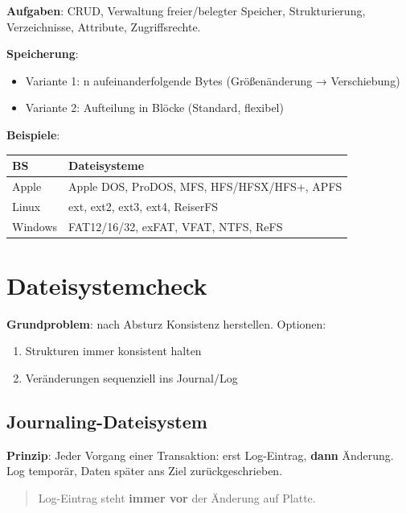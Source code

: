 \documentclass[11pt, a4paper]{article}
\begin{document}
\textbf{Aufgaben}: CRUD, Verwaltung freier/belegter Speicher, Strukturierung, Verzeichnisse, Attribute, Zugriffsrechte.


\textbf{Speicherung}:

\begin{itemize}
  \item Variante 1: n aufeinanderfolgende Bytes (Größenänderung → Verschiebung)
  \item Variante 2: Aufteilung in Blöcke (Standard, flexibel)
\end{itemize}

\textbf{Beispiele}:


{\small
\begin{tabularx}{\linewidth}{XX}
\hline
\rowcolor{tableheadbg}
{\color{white}\textbf{BS}} & {\color{white}\textbf{Dateisysteme}} \\[2pt]
\hline
\endhead
\hline
\endfoot
Apple & Apple DOS, ProDOS, MFS, HFS/HFSX/HFS+, APFS \\
Linux & ext, ext2, ext3, ext4, ReiserFS \\
Windows & FAT12/16/32, exFAT, VFAT, NTFS, ReFS \\
\end{tabularx}
}



\section{Dateisystemcheck}

\textbf{Grundproblem}: nach Absturz Konsistenz herstellen. Optionen:

\begin{enumerate}
  \item Strukturen immer konsistent halten
  \item Veränderungen sequenziell ins Journal/Log
\end{enumerate}


\subsection{Journaling-Dateisystem}

\textbf{Prinzip}: Jeder Vorgang einer Transaktion: erst Log-Eintrag, \textbf{dann} Änderung. Log temporär, Daten später ans Ziel zurückgeschrieben.


\begin{quote}
Log-Eintrag steht \textbf{immer vor} der Änderung auf Platte.
\end{quote}
\end{document}
